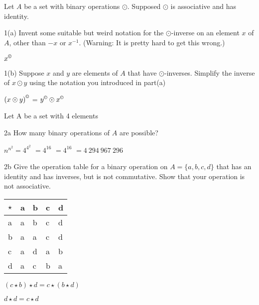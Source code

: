 \begin{question}{1}
Let $A$ be a set with binary operations $\odot$. Supposed $\odot$ is associative and has identity.
\end{question}

\begin{question}{1(a)}
Invent some suitable but weird notation for the $\odot$-inverse on an element $x$ of $A$, other than $-x$ or $x^{-1}$. (Warning: It is pretty hard to get this wrong.)
\end{question}

$x^{\copyright}$

\begin{question}{1(b)}
Suppose $x$ and $y$ are elements of $A$ that have $\odot$-inverses. Simplify the inverse of $x\odot y$ using the notation you introduced in part(a)
\end{question}

${(x\odot y)}^{\copyright}$ = $y^{\copyright}\odot x^{\copyright}$



\begin{question}{2}
Let A be a set with 4 elements
\end{question}

\begin{question}{2a}
How many binary operations of $A$ are possible?
\end{question}

$n^{n^2} = 4^{4^2}$
$= 4^{16}$
$= 4^{16}$
$= 4\ 294\ 967\ 296$
\begin{question}{2b}
Give the operation table for a binary operation on $A=\{a,b,c,d\}$ that has an identity and has inverses, but is not commutative. Show that your operation is not associative.
\end{question}

\begin{tabular}{l|llll}
$\star$ & a & b & c & d \\
\hline
a       & a & b & c & d \\
b       & a & a & c & d \\
c       & a & d & a & b \\
d       & a & c & b & a
\end{tabular}

$(c \star b) \star d =  c \star (b \star d)$

$d \star d =  c \star d$


